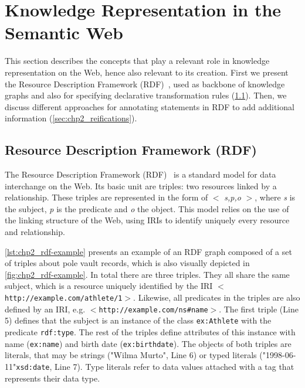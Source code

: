 \section{Knowledge Representation in the Semantic Web}
\label{sec:chp2_semweb}

This section describes the concepts that play a relevant role in knowledge representation on the Web, hence also relevant to its creation. First we present the Resource Description Framework (RDF)~\parencite{rdf}, used as backbone of knowledge graphs and also for specifying declarative transformation rules (\cref{sec:chp2_rdf}). Then, we discuss different approaches for annotating statements in RDF to add additional information (\cref{sec:chp2_reifications}).

\subsection{Resource Description Framework (RDF)}
\label{sec:chp2_rdf}

The Resource Description Framework (RDF)~\parencite{rdf,lassila1999rdf} is a standard model for data interchange on the Web. Its basic unit are triples: two resources linked by a relationship. These triples are represented in the form of $<$ \textit{s,p,o} $>$, where \textit{s} is the subject, \textit{p} is the predicate and \textit{o} the object. This model relies on the use of the linking structure of the Web, using IRIs to identify uniquely every resource and relationship. 

\cref{lst:chp2_rdf-example} presents an example of an RDF graph composed of a set of triples about pole vault records, which is also visually depicted in \cref{fig:chp2_rdf-example}. In total there are three triples. They all share the same subject, which is a resource uniquely identified by the IRI $<$\texttt{http://example.com/athlete/1}$>$. Likewise, all predicates in the triples are also defined by an IRI, e.g. $<$\texttt{http://example.com/ns\#name}$>$. The first triple (Line 5) defines that the subject is an instance of the class \texttt{ex:Athlete} with the predicate \texttt{rdf:type}. The rest of the triples define attributes of this instance with name (\texttt{ex:name}) and birth date (\texttt{ex:birthdate}). The objects of both triples are literals, that may be strings ("Wilma Murto", Line 6) or typed literals ("1998-06-11"\scalebox{.8}{\textsuperscript{$\wedge\wedge$}}\texttt{xsd:date}, Line 7). Type literals refer to data values attached with a tag that represents their data type.

